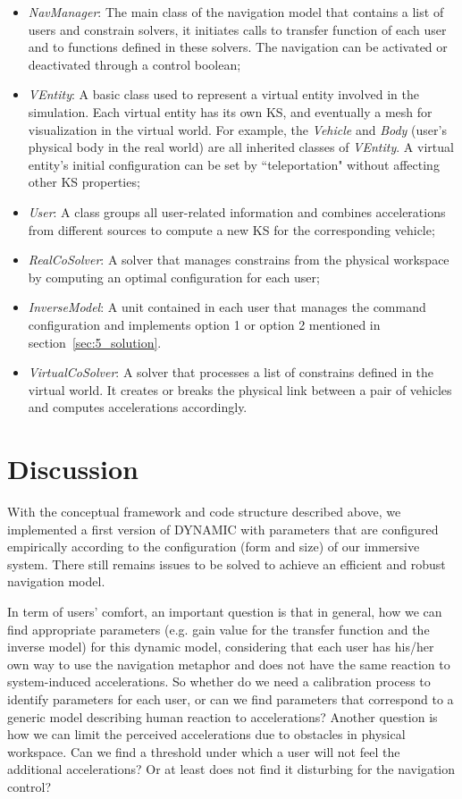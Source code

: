 \begin{itemize}
\item \textit{NavManager}: The main class of the navigation model that contains a list of users and constrain solvers, it initiates calls to transfer function of each user and to functions defined in these solvers. The navigation can be activated or deactivated through a control boolean;
\item \textit{VEntity}: A basic class used to represent a virtual entity involved in the simulation. Each virtual entity has its own KS, and eventually a mesh for visualization in the virtual world. For example, the \textit{Vehicle} and \textit{Body} (user's physical body in the real world) are all inherited classes of \textit{VEntity}. A virtual entity's initial configuration can be set by ``teleportation" without affecting other KS properties;
\item \textit{User}: A class groups all user-related information and combines accelerations from different sources to compute a new KS for the corresponding vehicle;
\item \textit{RealCoSolver}: A solver that manages constrains from the physical workspace by computing an optimal configuration for each user;
\item \textit{InverseModel}: A unit contained in each user that manages the command configuration and implements option 1 or option 2 mentioned in section~\ref{sec:5_solution}.
\item \textit{VirtualCoSolver}: A solver that processes a list of constrains defined in the virtual world. It creates or breaks the physical link between a pair of vehicles and computes accelerations accordingly. 
\end{itemize}


\section{Discussion}
With the conceptual framework and code structure described above, we implemented a first version of DYNAMIC with parameters that are configured empirically according to the configuration (form and size) of our immersive system. There still remains issues to be solved to achieve an efficient and robust navigation model.

In term of users' comfort, an important question is that in general, how we can find appropriate parameters (e.g. gain value for the transfer function and the inverse model) for this dynamic model, considering that each user has his/her own way to use the navigation metaphor and does not have the same reaction to system-induced accelerations. So whether do we need a calibration process to identify parameters for each user, or can we find parameters that correspond to a generic model describing human reaction to accelerations? Another question is how we can limit the perceived accelerations due to obstacles in physical workspace. Can we find a threshold under which a user will not feel the additional accelerations? Or at least does not find it disturbing for the navigation control?

